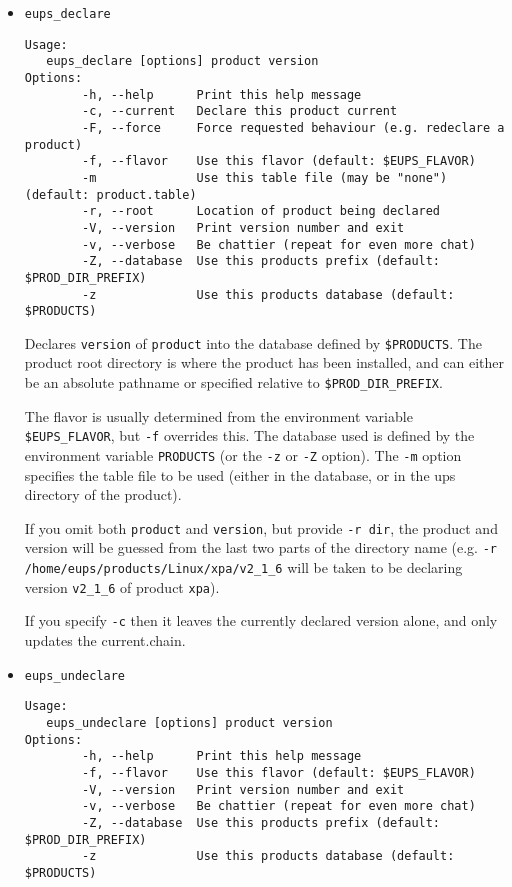 \documentclass{article}
\begin{document}
\begin{itemize}


\item \texttt{eups\_declare}
\begin{verbatim}
Usage:
   eups_declare [options] product version
Options:
        -h, --help      Print this help message
        -c, --current   Declare this product current
        -F, --force     Force requested behaviour (e.g. redeclare a product)
        -f, --flavor    Use this flavor (default: $EUPS_FLAVOR)
        -m              Use this table file (may be "none") (default: product.table)
        -r, --root      Location of product being declared
        -V, --version   Print version number and exit
        -v, --verbose   Be chattier (repeat for even more chat)
        -Z, --database  Use this products prefix (default: $PROD_DIR_PREFIX)
        -z              Use this products database (default: $PRODUCTS)
\end{verbatim}

Declares \texttt{version} of \texttt{product} into the database defined by \texttt{\$PRODUCTS}.
The product root directory is where the product has been installed, and can either
be an absolute pathname or specified relative to \texttt{\$PROD\_DIR\_PREFIX}.

The flavor is usually determined from the
environment variable \texttt{\$EUPS\_FLAVOR}, but \texttt{-f}
overrides this. The database used is defined by the environment
variable \texttt{PRODUCTS} (or the \texttt{-z} or \texttt{-Z} option).
The \texttt{-m} option specifies the table
file to be used (either in the database, or in the ups directory of the product).

If you omit both \texttt{product} and \texttt{version}, but provide \texttt{-r dir},
the product and version will be guessed from the last two parts of the directory
name (e.g. \texttt{-r /home/eups/products/Linux/xpa/v2\_1\_6} will be taken to be
declaring version \texttt{v2\_1\_6} of product \texttt{xpa}).

If you specify \texttt{-c} then it leaves the currently declared version alone, and
only updates the current.chain.


  \item \texttt{eups\_undeclare}
\begin{verbatim}
Usage:
   eups_undeclare [options] product version
Options:
        -h, --help      Print this help message
        -f, --flavor    Use this flavor (default: $EUPS_FLAVOR)
        -V, --version   Print version number and exit
        -v, --verbose   Be chattier (repeat for even more chat)
        -Z, --database  Use this products prefix (default: $PROD_DIR_PREFIX)
        -z              Use this products database (default: $PRODUCTS)
\end{verbatim}
  

\end{itemize}
\end{document}

